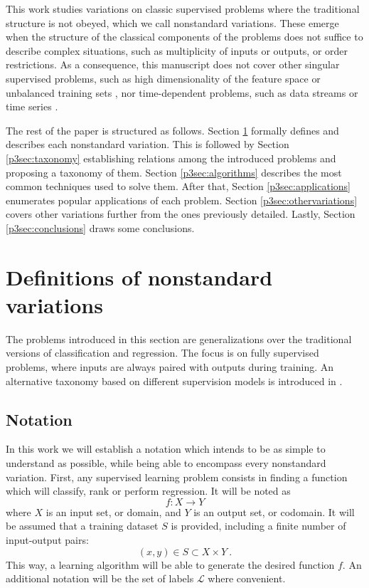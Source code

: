 This work studies variations on classic supervised problems where the traditional structure is not obeyed, which we call nonstandard variations. These emerge when the structure of the classical components of the problems does not suffice to describe complex situations, such as multiplicity of inputs or outputs, or order restrictions. As a consequence, this manuscript does not cover other singular supervised problems, such as high dimensionality of the feature space \cite{highdim} or unbalanced training sets \cite{imbalanced,imbalanced-krawczyk}, nor time-dependent problems, such as data streams \cite{streams,streams2} or time series \cite{timeseries}.

The rest of the paper is structured as follows. Section \ref{p3sec:definitions} formally defines and describes each nonstandard variation. This is followed by Section \ref{p3sec:taxonomy} establishing relations among the introduced problems and proposing a taxonomy of them. Section \ref{p3sec:algorithms} describes the most common techniques used to solve them. After that, Section \ref{p3sec:applications} enumerates popular applications of each problem. {Section \ref{p3sec:othervariations} covers other variations further from the ones previously detailed.} Lastly, Section \ref{p3sec:conclusions} draws some conclusions.

\section{Definitions of nonstandard variations}
\label{p3sec:definitions}

The problems introduced in this section are generalizations over the traditional versions of classification and regression. The focus is on fully supervised problems, where inputs are always paired with outputs during training. An alternative taxonomy based on different supervision models is introduced in \cite{weak-nonstandard}.


\subsection{Notation}
\label{p3sec:notation}

In this work we will establish a notation which intends to be as simple to understand as possible, while being able to encompass every nonstandard variation. First, any supervised learning problem consists in finding a function which will classify, rank or perform regression. It will be noted as
\begin{equation}
  f: X\rightarrow Y
\end{equation}
where $X$ is an input set, or domain, and $Y$ is an output set, or codomain. It will be assumed that a training dataset $S$ is provided, including a finite number of input-output pairs:
\begin{equation}
  (x, y)\in S\subset X\times Y~.
\end{equation}
This way, a learning algorithm will be able to generate the desired function $f$. An additional notation will be the set of labels $\mathcal L$ where convenient. 

